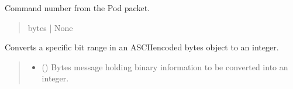 \documentclass[letterpaper,10pt,english]{sphinxmanual}
\begin{document}
\begin{fulllineitems}
\begin{fulllineitems}
\begin{quote}
\begin{description}
\end{description}\end{quote}

\end{fulllineitems}


\begin{fulllineitems}
\label{\detokenize{Morelia.Packets:Morelia.Packets.Packet.Packet.commandNumber}}
\pysigstartsignatures
{}
\pysigstopsignatures
\sphinxAtStartPar
Command number from the Pod packet.
\begin{quote}\begin{description}
\sphinxAtStartPar
bytes | None

\end{description}\end{quote}

\end{fulllineitems}


\begin{fulllineitems}
\label{\detokenize{Morelia.Packets:Morelia.Packets.Packet.Packet.ASCIIbytesToInt_Split}}
\pysigstartsignatures
{}
\pysigstopsignatures
\sphinxAtStartPar
Converts a specific bit range in an ASCII\sphinxhyphen{}encoded bytes object to an integer.
\begin{quote}\begin{description}
\begin{itemize}
\item {} 
\sphinxAtStartPar
{} () \textendash{} Bytes message holding binary information to be converted into an integer.


\end{itemize}
\end{description}
\end{quote}
\end{fulllineitems}
\end{fulllineitems}
\end{document}
